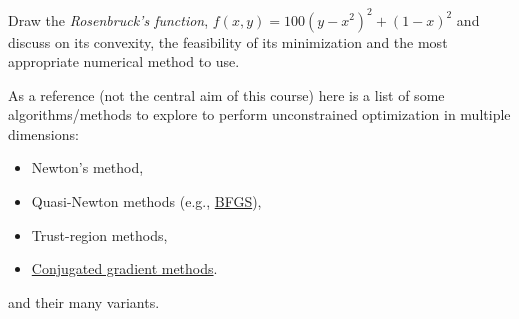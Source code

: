 \begin{Exercise}
  Draw the {\em Rosenbruck's function}, $f(x,y)=100(y-x^2)^2+(1-x)^2$ and discuss on its convexity, the feasibility of its minimization and the most appropriate numerical method to use.
\end{Exercise}



  As a reference (not the central aim of this course) here is a list of some algorithms/methods to explore to perform unconstrained optimization in multiple dimensions:
  \begin{itemize}
    \item Newton's method,
    \item Quasi-Newton methods (e.g., \href{https://machinelearningmastery.com/bfgs-optimization-in-python/}{BFGS}),
    \item Trust-region methods,
    \item \href{https://en.wikipedia.org/wiki/Conjugate_gradient_method}{Conjugated gradient methods}.
  \end{itemize}
  and their many variants.

